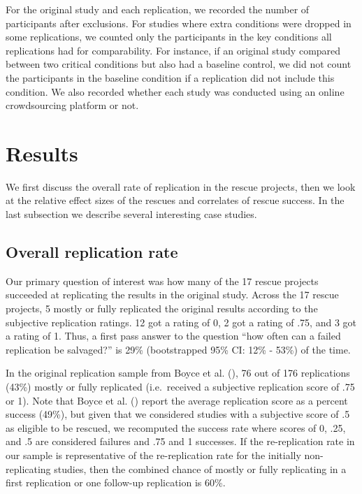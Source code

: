 \documentclass[
  english,
  a4paper,
]{article}
\begin{document}
For the original study and each replication, we recorded the number of participants after exclusions.
For studies where extra conditions were dropped in some replications, we counted only the participants in the key conditions all replications had for comparability.
For instance, if an original study compared between two critical conditions but also had a baseline control, we did not count the participants in the baseline condition if a replication did not include this condition.
We also recorded whether each study was conducted using an online crowdsourcing platform or not.

\section{Results}\label{results}

We first discuss the overall rate of replication in the rescue projects, then we look at the relative effect sizes of the rescues and correlates of rescue success.
In the last subsection we describe several interesting case studies.

\subsection{Overall replication rate}\label{overall-replication-rate}

Our primary question of interest was how many of the 17 rescue projects succeeded at replicating the results in the original study.
Across the 17 rescue projects, 5 mostly or fully replicated the original results according to the subjective replication ratings.
12 got a rating of 0, 2 got a rating of .75, and 3 got a rating of 1.
Thus, a first pass answer to the question ``how often can a failed replication be salvaged?'' is 29\% (bootstrapped 95\% CI: 12\% - 53\%) of the time.

In the original replication sample from Boyce et al. (), 76 out of 176 replications (43\%) mostly or fully replicated (i.e.~received a subjective replication score of .75 or 1).
Note that Boyce et al. () report the average replication score as a percent success (49\%), but given that we considered studies with a subjective score of .5 as eligible to be rescued, we recomputed the success rate where scores of 0, .25, and .5 are considered failures and .75 and 1 successes.
If the re-replication rate in our sample is representative of the re-replication rate for the initially non-replicating studies, then the combined chance of mostly or fully replicating in a first replication or one follow-up replication is 60\%.
\end{document}
